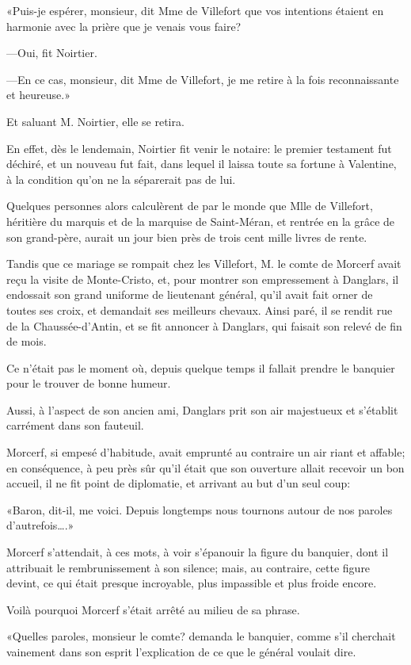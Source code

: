 «Puis-je espérer, monsieur, dit Mme de Villefort que vos intentions étaient en harmonie avec la prière que je venais vous faire? 

—Oui, fit Noirtier. 

—En ce cas, monsieur, dit Mme de Villefort, je me retire à la fois reconnaissante et heureuse.» 

Et saluant M. Noirtier, elle se retira. 

En effet, dès le lendemain, Noirtier fit venir le notaire: le premier testament fut déchiré, et un nouveau fut fait, dans lequel il laissa toute sa fortune à Valentine, à la condition qu'on ne la séparerait pas de lui. 

Quelques personnes alors calculèrent de par le monde que Mlle de Villefort, héritière du marquis et de la marquise de Saint-Méran, et rentrée en la grâce de son grand-père, aurait un jour bien près de trois cent mille livres de rente. 

Tandis que ce mariage se rompait chez les Villefort, M. le comte de Morcerf avait reçu la visite de Monte-Cristo, et, pour montrer son empressement à Danglars, il endossait son grand uniforme de lieutenant général, qu'il avait fait orner de toutes ses croix, et demandait ses meilleurs chevaux. Ainsi paré, il se rendit rue de la Chaussée-d'Antin, et se fit annoncer à Danglars, qui faisait son relevé de fin de mois. 

Ce n'était pas le moment où, depuis quelque temps il fallait prendre le banquier pour le trouver de bonne humeur. 

Aussi, à l'aspect de son ancien ami, Danglars prit son air majestueux et s'établit carrément dans son fauteuil. 

Morcerf, si empesé d'habitude, avait emprunté au contraire un air riant et affable; en conséquence, à peu près sûr qu'il était que son ouverture allait recevoir un bon accueil, il ne fit point de diplomatie, et arrivant au but d'un seul coup: 

«Baron, dit-il, me voici. Depuis longtemps nous tournons autour de nos paroles d'autrefois\dots.» 

Morcerf s'attendait, à ces mots, à voir s'épanouir la figure du banquier, dont il attribuait le rembrunissement à son silence; mais, au contraire, cette figure devint, ce qui était presque incroyable, plus impassible et plus froide encore. 

Voilà pourquoi Morcerf s'était arrêté au milieu de sa phrase. 

«Quelles paroles, monsieur le comte? demanda le banquier, comme s'il cherchait vainement dans son esprit l'explication de ce que le général voulait dire. 

